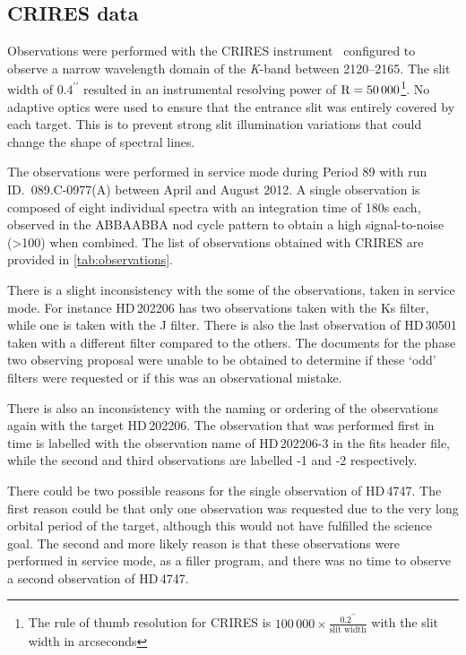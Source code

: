 \subsection{CRIRES data}
\label{subsec:CRIRES}
Observations were performed with the {CRIRES} instrument~\citep{kaeufl_crires_2004} configured to observe a narrow wavelength domain of the \emph{K}-band between 2120--2165\nm{}.
The slit width of \(0.4^{\prime\prime}\) resulted in an instrumental resolving power of \(\textrm{R}=50\,000\)\footnote{The rule of thumb resolution for {CRIRES} is \(100\,000\times \frac{0.2^{\prime\prime}}{\textrm{slit width}}\) with the slit width in arcseconds}.
No adaptive optics were used to ensure that the entrance slit was entirely covered by each target.
This is to prevent strong slit illumination variations that could change the shape of spectral lines.

The observations were performed in service mode during {Period 89} with run {ID.~089.C-0977(A)} between April and August 2012.
A single observation is composed of eight individual spectra with an integration time of 180\si{\second} each, observed in the {ABBAABBA} nod cycle pattern to obtain a high signal-to-noise (>100) when combined.
The list of observations obtained with {CRIRES} are provided in \cref{tab:observations}.

There is a slight inconsistency with the some of the observations, taken in service mode.
For instance {HD\,202206} has two observations taken with the {Ks} filter, while one is taken with the {J} filter.
There is also the last observation of {HD\,30501} taken with a different filter compared to the others.
The documents for the phase two observing proposal were unable to be obtained to determine if these `odd' filters were requested or if this was an observational mistake.

There is also an inconsistency with the naming or ordering of the observations again with the target {HD\,202206}.
The observation that was performed first in time is labelled with the observation name of {HD\,202206-3} in the fits header file, while the second and third observations are labelled -1 and -2 respectively.

There could be two possible reasons for the single observation of {HD\,4747}.
The first reason could be that only one observation was requested due to the very long orbital period of the target, although this would not have fulfilled the science goal.
The second and more likely reason is that these observations were performed in service mode, as a filler program, and there was no time to observe a second observation of {HD\,4747}.

